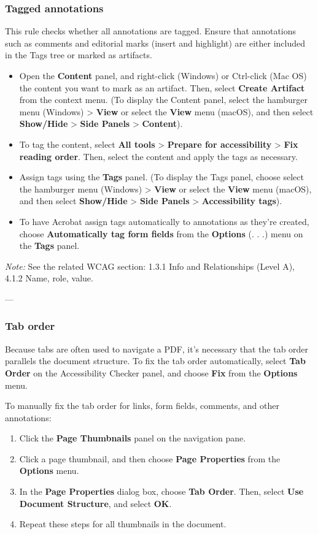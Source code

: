 \subsubsection*{Tagged annotations}
This rule checks whether all annotations are tagged. Ensure that annotations such as comments and editorial marks (insert and highlight) are either included in the Tags tree or marked as artifacts\footnotemark[1].
\begin{itemize}
    \item Open the \textbf{Content} panel, and right-click (Windows) or Ctrl-click (Mac OS) the content you want to mark as an artifact. Then, select \textbf{Create Artifact} from the context menu. (To display the Content panel, select the hamburger menu (Windows) > \textbf{View} or select the \textbf{View} menu (macOS), and then select \textbf{Show/Hide} > \textbf{Side Panels} > \textbf{Content}).
    \item To tag the content, select \textbf{All tools} > \textbf{Prepare for accessibility} > \textbf{Fix reading order}. Then, select the content and apply the tags as necessary.
    \item Assign tags using the \textbf{Tags} panel. (To display the Tags panel, choose select the hamburger menu (Windows) > \textbf{View} or select the \textbf{View} menu (macOS), and then select \textbf{Show/Hide} > \textbf{Side Panels} > \textbf{Accessibility tags}).
    \item To have Acrobat assign tags automatically to annotations as they're created, choose \textbf{Automatically tag form fields} from the \textbf{Options} (. . .) menu on the \textbf{Tags} panel.
\end{itemize}

\vspace{0.5em}
\noindent\textit{Note:} See the related WCAG section: 1.3.1 Info and Relationships (Level A), 4.1.2 Name, role, value\footnotemark[1].

---

\subsubsection*{Tab order}
Because tabs are often used to navigate a PDF, it's necessary that the tab order parallels the document structure\footnotemark[1].
To fix the tab order automatically, select \textbf{Tab Order} on the Accessibility Checker panel, and choose \textbf{Fix} from the \textbf{Options} menu.

To manually fix the tab order for links, form fields, comments, and other annotations:
\begin{enumerate}
    \item Click the \textbf{Page Thumbnails} panel on the navigation pane.
    \item Click a page thumbnail, and then choose \textbf{Page Properties} from the \textbf{Options} menu.
    \item In the \textbf{Page Properties} dialog box, choose \textbf{Tab Order}. Then, select \textbf{Use Document Structure}, and select \textbf{OK}.
    \item Repeat these steps for all thumbnails in the document.
\end{enumerate}

